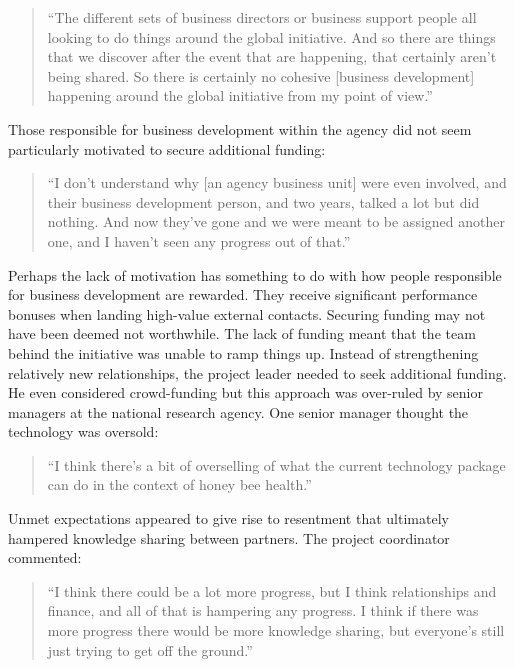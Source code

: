 \begin{quote}
\small
\enquote{The different sets of business directors or business support people all looking to do things around the global initiative. And so there are things that we discover after the event that are happening, that certainly aren't being shared. So there is certainly no cohesive [business development] happening around the global initiative from my point of view.} \\
\end{quote}

Those responsible for business development within the agency did not seem particularly motivated to secure additional funding:

\begin{quote}
\small
\enquote{I don't understand why [an agency business unit] were even involved, and their business development person, and two years, talked a lot but did nothing. And now they've gone and we were meant to be assigned another one, and I haven't seen any progress out of that.} \\
\end{quote}
 
Perhaps the lack of motivation has something to do with how people responsible for business development are rewarded. They receive significant performance bonuses when landing high-value external contacts. Securing funding may not have been deemed not worthwhile. The lack of funding meant that the team behind the initiative was unable to ramp things up. Instead of strengthening relatively new relationships, the project leader needed to seek additional funding. He even considered crowd-funding but this approach was over-ruled by senior managers at the national research agency. One senior manager thought the technology was oversold:

 \begin{quote}
\small
\enquote{I think there’s a bit of overselling of what the current technology package can do in the context of honey bee health.} \\
\end{quote}
 
 Unmet expectations appeared to give rise to resentment that ultimately hampered knowledge sharing between partners. The project coordinator commented:

\begin{quote}
\small
\enquote{I think there could be a lot more progress, but I think relationships and finance, and all of that is hampering any progress. I think if there was more progress there would be more knowledge sharing, but everyone's still just trying to get off the ground.} \\
\end{quote}

